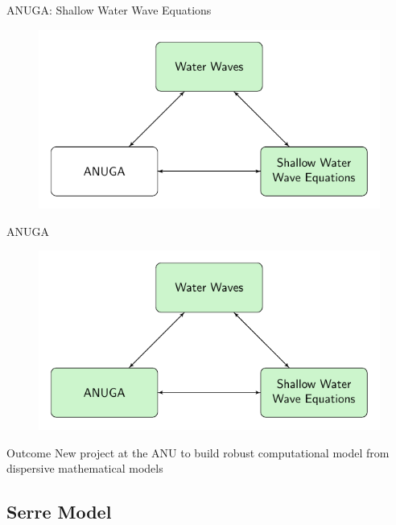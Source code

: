 \documentclass[handout]{beamer}
\begin{document}
\begin{frame}{ANUGA: Shallow Water Wave Equations}
	\begin{figure}
		\includegraphics[width=\textwidth]{./Pics/ModelDiagrams/FlowChartANUGA12G.pdf}
	\end{figure}
\end{frame}

\begin{frame}{ANUGA}
	\begin{figure}
		\includegraphics[width=\textwidth]{./Pics/ModelDiagrams/FlowChartANUGA123G.pdf}
	\end{figure}
\end{frame}


\begin{frame}{Outcome}
 New project at the ANU to build robust computational model from dispersive mathematical models
\end{frame}

\subsection{Serre Model}
\end{document}
